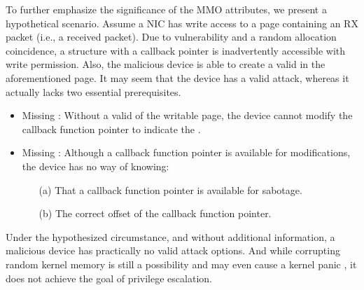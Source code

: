 To further emphasize the significance of the MMO attributes, we present a hypothetical scenario. Assume a NIC has write access to a page containing an RX packet (i.e., a received packet). Due to \subpage{} vulnerability and a random allocation coincidence, a structure with a callback pointer is inadvertently accessible with write permission. Also, the malicious device is able to create a valid \mabaf{} in the aforementioned page. It may seem that the device has a valid attack, whereas it actually lacks two essential prerequisites.

\begin{itemize}
    \item Missing \means: Without a valid \kva{} of the writable page, the device cannot modify the callback function pointer to indicate the \mabaf.
    \item Missing \oportunity: Although a callback function pointer is available for modifications, the device has no way of knowing: 
    \begin{enumerate}
        \item[(a)] That a callback function pointer is available for sabotage.
        \item[(b)] The correct offset of the callback function pointer.
    \end{enumerate}
\end{itemize}

Under the hypothesized circumstance, and without additional information, a malicious device has practically no valid attack options. 
And while corrupting random kernel memory is still a possibility and may even cause a kernel panic \cite{MMT16}, it does not achieve the goal of privilege escalation.




